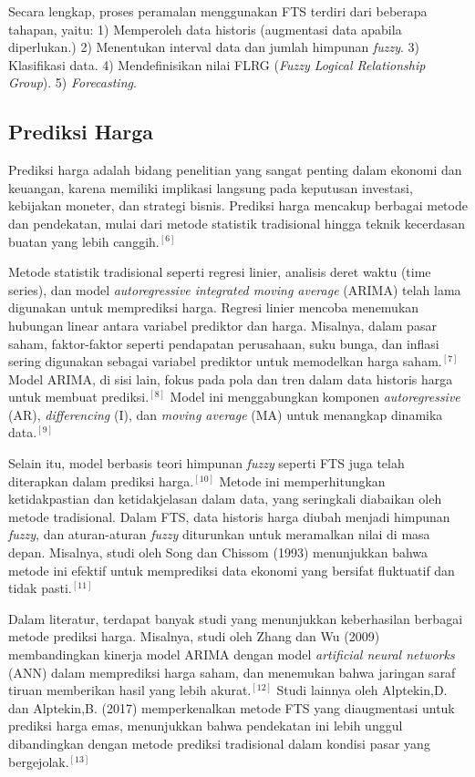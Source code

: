 \documentclass[conference]{IEEEtran}
\begin{document}
Secara lengkap, proses peramalan menggunakan FTS terdiri dari beberapa tahapan, yaitu:
    1) Memperoleh data historis (augmentasi data apabila diperlukan.)
    2) Menentukan interval data dan jumlah himpunan \textit{fuzzy}.
    3) Klasifikasi data.
    4) Mendefinisikan nilai FLRG (\textit{Fuzzy Logical Relationship Group}).
    5) \textit{Forecasting}.
    

\subsection{Prediksi Harga}
Prediksi harga adalah bidang penelitian yang sangat penting dalam ekonomi dan keuangan, karena memiliki implikasi langsung pada keputusan investasi, kebijakan moneter, dan strategi bisnis. Prediksi harga mencakup berbagai metode dan pendekatan, mulai dari metode statistik tradisional hingga teknik kecerdasan buatan yang lebih canggih.$^{[6]}$

Metode statistik tradisional seperti regresi linier, analisis deret waktu (time series), dan model \textit{autoregressive integrated moving average} (ARIMA) telah lama digunakan untuk memprediksi harga. Regresi linier mencoba menemukan hubungan linear antara variabel prediktor dan harga. Misalnya, dalam pasar saham, faktor-faktor seperti pendapatan perusahaan, suku bunga, dan inflasi sering digunakan sebagai variabel prediktor untuk memodelkan harga saham.$^{[7]}$ Model ARIMA, di sisi lain, fokus pada pola dan tren dalam data historis harga untuk membuat prediksi.$^{[8]}$ Model ini menggabungkan komponen \textit{autoregressive} (AR), \textit{differencing} (I), dan \textit{moving average} (MA) untuk menangkap dinamika data.$^{[9]}$

Selain itu, model berbasis teori himpunan \textit{fuzzy} seperti FTS juga telah diterapkan dalam prediksi harga.$^{[10]}$ Metode ini memperhitungkan ketidakpastian dan ketidakjelasan dalam data, yang seringkali diabaikan oleh metode tradisional. Dalam FTS, data historis harga diubah menjadi himpunan \textit{fuzzy}, dan aturan-aturan \textit{fuzzy} diturunkan untuk meramalkan nilai di masa depan. Misalnya, studi oleh Song dan Chissom (1993) menunjukkan bahwa metode ini efektif untuk memprediksi data ekonomi yang bersifat fluktuatif dan tidak pasti.$^{[11]}$

Dalam literatur, terdapat banyak studi yang menunjukkan keberhasilan berbagai metode prediksi harga. Misalnya, studi oleh Zhang dan Wu (2009) membandingkan kinerja model ARIMA dengan model \textit{artificial neural networks} (ANN) dalam memprediksi harga saham, dan menemukan bahwa jaringan saraf tiruan memberikan hasil yang lebih akurat.$^{[12]}$ Studi lainnya oleh Alptekin,D. dan Alptekin,B. (2017) memperkenalkan metode FTS yang diaugmentasi untuk prediksi harga emas, menunjukkan bahwa pendekatan ini lebih unggul dibandingkan dengan metode prediksi tradisional dalam kondisi pasar yang bergejolak.$^{[13]}$
\end{document}
